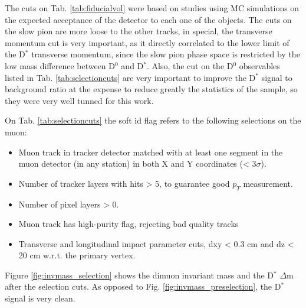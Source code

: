 The cuts on Tab. \ref{tab:fiducialvol} were based on studies using MC simulations on the expected acceptance of the detector to each one of the objects. The cuts on the slow pion are more loose to the other tracks, in special, the transverse momentum cut is very important, as it directly correlated to the lower limit of the D$^*$ transverse momentum, since the slow pion phase space is restricted by the low mass difference between D$^0$ and D$^*$. Also, the cut on the D$^0$ observables listed in Tab. \ref{tab:selectioncuts} are very important to improve the D$^*$ signal to background ratio at the expense to reduce greatly the statistics of the sample, so they were very well tunned for this work.

On Tab. \ref{tab:selectioncuts} the soft id flag refers to the following selections on the muon:
\begin{itemize}
  \item Muon track in tracker detector matched with at least one segment in the muon detector (in any station) in both X and Y coordinates (< 3$\sigma$).
  \item Number of tracker layers with hits > 5, to guarantee good $p_T$ measurement.
  \item Number of pixel layers > 0.
  \item Muon track has high-purity flag, rejecting bad quality tracks
  \item Transverse and longitudinal impact parameter cuts, dxy < 0.3 cm and dz < 20 cm w.r.t. the primary vertex.
\end{itemize}

Figure \ref{fig:invmass_selection} shows the dimuon invariant mass and the D$^*$ $\Delta$m after the selection cuts. As opposed to Fig. \ref{fig:invmass_preselection}, the D$^*$ signal is very clean.

